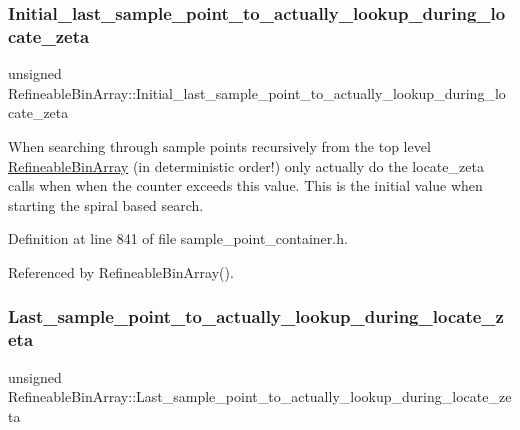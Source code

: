 \subsubsection{\texorpdfstring{Initial\+\_\+last\+\_\+sample\+\_\+point\+\_\+to\+\_\+actually\+\_\+lookup\+\_\+during\+\_\+locate\+\_\+zeta}{Initial\_last\_sample\_point\_to\_actually\_lookup\_during\_locate\_zeta}}
{\footnotesize\ttfamily unsigned Refineable\+Bin\+Array\+::\+Initial\+\_\+last\+\_\+sample\+\_\+point\+\_\+to\+\_\+actually\+\_\+lookup\+\_\+during\+\_\+locate\+\_\+zeta\hspace{0.3cm}{\ttfamily [private]}}



When searching through sample points recursively from the top level \hyperlink{classRefineableBinArray}{Refineable\+Bin\+Array} (in deterministic order!) only actually do the locate\+\_\+zeta calls when when the counter exceeds this value. This is the initial value when starting the spiral based search. 



Definition at line 841 of file sample\+\_\+point\+\_\+container.\+h.



Referenced by Refineable\+Bin\+Array().

\mbox{\label{classRefineableBinArray_aa2f3e80292b0b82fc0a41815dac9958d}} 
\subsubsection{\texorpdfstring{Last\+\_\+sample\+\_\+point\+\_\+to\+\_\+actually\+\_\+lookup\+\_\+during\+\_\+locate\+\_\+zeta}{Last\_sample\_point\_to\_actually\_lookup\_during\_locate\_zeta}}
{\footnotesize\ttfamily unsigned Refineable\+Bin\+Array\+::\+Last\+\_\+sample\+\_\+point\+\_\+to\+\_\+actually\+\_\+lookup\+\_\+during\+\_\+locate\+\_\+zeta\hspace{0.3cm}{\ttfamily [private]}}



